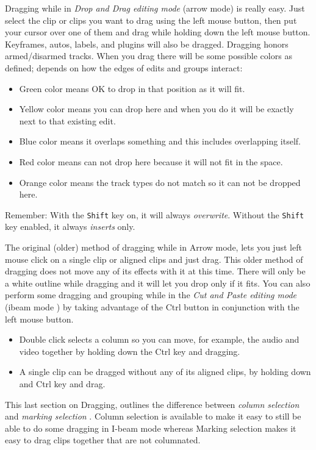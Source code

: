 Dragging while in \textit{Drop and Drag editing mode} (arrow mode)
is really easy.  Just select  the clip or clips you want to drag
using the left mouse button, then put your cursor over one of them
and drag while holding down the left mouse button.  Keyframes,
autos, labels, and plugins will also be dragged.  Dragging honors
armed/disarmed tracks.  When you drag there will be some possible
colors as defined; depends on how the edges of edits and groups
interact:

\begin{itemize}
\item Green color means OK to drop in that position as it will
  fit.
\item Yellow color means you can drop here and when you do it
  will be exactly next to that existing edit.
\item Blue color means it overlaps something and this includes
  overlapping itself.
\item Red color means can not drop here because it will not fit
  in the space.
\item Orange color means the track types do not match so it can
  not be dropped here.
\end{itemize}

Remember: With the \texttt{Shift} key on, it will always
\textit{overwrite}. Without the \texttt{Shift} key enabled, it
always \textit{inserts} only.

The original (older) method of dragging while in Arrow  mode, lets
you just left mouse click on a single clip or aligned clips and just
drag.  This older method of dragging does not move any of its
effects with it at this time.  There will only be a white outline
while dragging and it will let you drop only if it fits.  You can
also perform some dragging and grouping while in the \textit{Cut and
  Paste editing mode} (ibeam mode ) by taking advantage of the Ctrl
button in conjunction with the left mouse button.

\begin{itemize}
\item Double click selects a column so you can move, for
  example, the audio and video together by holding down the Ctrl key
  and dragging.
\item A single clip can be dragged without any of its aligned
  clips, by holding down and Ctrl key and drag.
\end{itemize}

This last section on Dragging, outlines the difference
between \textit{column selection}  and \textit{marking selection} .
Column selection is available to make it easy to still be able to do
some dragging in I-beam mode whereas Marking selection makes it easy
to drag clips together that are not columnated.


